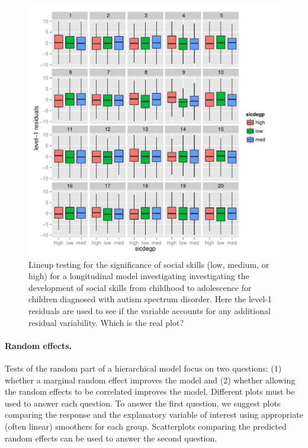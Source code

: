\documentclass{article} %
\begin{document}
\begin{figure}
	\centering
	\includegraphics[width=\textwidth]{sicdegp_level1_lineup9.pdf}
	\caption{\label{fig:boxplot-unordered} Lineup testing for the significance of social skills (low, medium, or high) for a longitudinal model investigating investigating the development of social skills from childhood to adolescence for children diagnosed with autism spectrum disorder. Here the level-1 residuals are used to see if the variable accounts for any additional residual variability. Which is the real plot?}
\end{figure}



\paragraph{Random effects.} Tests of the random part of a hierarchical model focus on two questions: (1) whether a marginal random effect improves the model and (2) whether allowing the random effects to be correlated improves the model. Different plots must be used to answer each question. To answer the first question, we suggest plots comparing the response and the explanatory variable of interest using appropriate (often linear) smoothers for each group. Scatterplots comparing the predicted random effects can be used to answer the second question.
\end{document}
